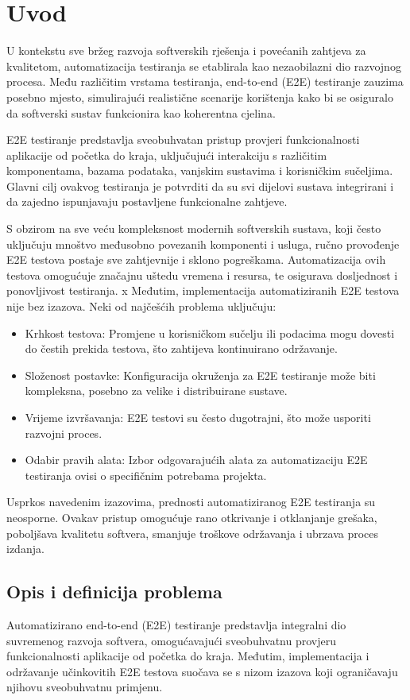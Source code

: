\chapter{Uvod}\label{OpisIOgranicenja}
U kontekstu sve bržeg razvoja softverskih rješenja i povećanih zahtjeva za kvalitetom, automatizacija testiranja se etablirala kao nezaobilazni dio razvojnog procesa. Među različitim vrstama testiranja, end-to-end (E2E) testiranje zauzima posebno mjesto, simulirajući realistične scenarije korištenja kako bi se osiguralo da softverski sustav funkcionira kao koherentna cjelina.

E2E testiranje predstavlja sveobuhvatan pristup provjeri funkcionalnosti aplikacije od početka do kraja, uključujući interakciju s različitim komponentama, bazama podataka, vanjskim sustavima i korisničkim sučeljima. Glavni cilj ovakvog testiranja je potvrditi da su svi dijelovi sustava integrirani i da zajedno ispunjavaju postavljene funkcionalne zahtjeve.

S obzirom na sve veću kompleksnost modernih softverskih sustava, koji često uključuju mnoštvo međusobno povezanih komponenti i usluga, ručno provođenje E2E testova postaje sve zahtjevnije i sklono pogreškama. Automatizacija ovih testova omogućuje značajnu uštedu vremena i resursa, te osigurava dosljednost i ponovljivost testiranja.
x
Međutim, implementacija automatiziranih E2E testova nije bez izazova. Neki od najčešćih problema uključuju:
\begin{itemize}
    \item Krhkost testova: Promjene u korisničkom sučelju ili podacima mogu dovesti do čestih prekida testova, što zahtijeva kontinuirano održavanje.
    \item Složenost postavke: Konfiguracija okruženja za E2E testiranje može biti kompleksna, posebno za velike i distribuirane sustave.
    \item Vrijeme izvršavanja: E2E testovi su često dugotrajni, što može usporiti razvojni proces.
    \item Odabir pravih alata: Izbor odgovarajućih alata za automatizaciju E2E testiranja ovisi o specifičnim potrebama projekta.
\end{itemize}

Usprkos navedenim izazovima, prednosti automatiziranog E2E testiranja su neosporne.
Ovakav pristup omogućuje rano otkrivanje i otklanjanje grešaka, poboljšava kvalitetu softvera, smanjuje troškove održavanja i ubrzava proces izdanja.


\section*{Opis i definicija problema}
Automatizirano end-to-end (E2E) testiranje predstavlja integralni dio suvremenog razvoja softvera, omogućavajući sveobuhvatnu provjeru funkcionalnosti aplikacije od početka do kraja.
Međutim, implementacija i održavanje učinkovitih E2E testova suočava se s nizom izazova koji ograničavaju njihovu sveobuhvatnu primjenu.

